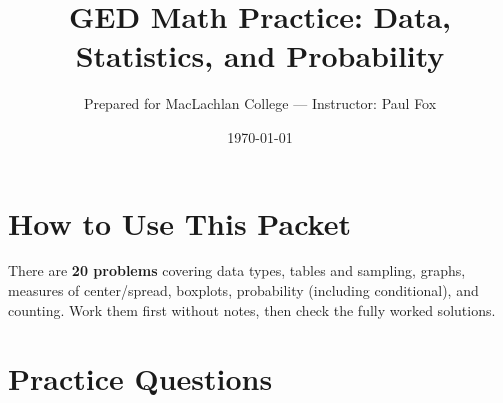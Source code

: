 \documentclass[11pt]{article}
\title{GED Math Practice: Data, Statistics, and Probability}
\author{Prepared for MacLachlan College --- Instructor: Paul Fox}
\date{\today}
\begin{document}
\maketitle
\tableofcontents
\bigskip

\section*{How to Use This Packet}
There are \textbf{20 problems} covering data types, tables and sampling, graphs, measures of center/spread, boxplots, probability (including conditional), and counting. Work them first without notes, then check the fully worked solutions.

\newpage
\section{Practice Questions}
\end{document}
